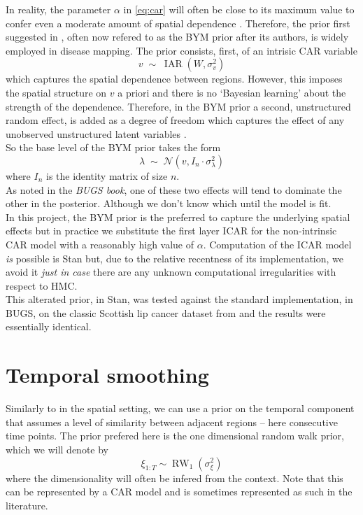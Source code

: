 \documentclass[11pt]{report}
\begin{document}
In reality, the parameter $\alpha$ in \ref{eq:car} will often be close to its maximum value to confer even a moderate amount of spatial dependence \citep{bugs}. Therefore, the prior first suggested in \citet*{bym}, often now refered to as the BYM prior after its authors, is widely employed in disease mapping. The prior consists, first, of an intrisic CAR variable
\begin{equation*}
v \; \sim \; \operatorname{IAR}(W, \sigma_v^2)
\end{equation*}
which captures the spatial dependence between regions. However, this imposes the spatial structure on $v$ a priori and there is no `Bayesian learning' about the strength of the dependence. Therefore, in the BYM prior a second, unstructured random effect, is added as a degree of freedom which captures the effect of any unobserved unstructured latent variables \citep{bugs}. \\

So the base level of the BYM prior takes the form
\begin{equation}
\lambda \; \sim \; \mathcal{N}(v, I_n \cdot \sigma_{\lambda}^2)
\end{equation}
where $I_n$ is the identity matrix of size $n$. \\

As noted in the \emph{BUGS book}, one of these two effects will tend to dominate the other in the posterior. Although we don't know which until the model is fit. \\

In this project, the BYM prior is the preferred to capture the underlying spatial effects but in practice we substitute the first layer ICAR for the non-intrinsic CAR model with a reasonably high value of $\alpha$. Computation of the ICAR model \emph{is} possible is Stan \citep{car} but, due to the relative recentness of its implementation, we avoid it \emph{just in case} there are any unknown computational irregularities with respect to HMC. \\

This alterated prior, in Stan, was tested against the standard implementation, in BUGS, on the classic Scottish lip cancer dataset from \citet{lipcancer} and the results were essentially identical.   

\section{Temporal smoothing}

Similarly to in the spatial setting, we can use a prior on the temporal component that assumes a level of similarity between adjacent regions -- here consecutive time points. The prior prefered here is the one dimensional random walk prior, which we will denote by
\begin{equation}
\xi_{1:T} \sim \operatorname{RW}_1(\sigma_\xi^2)
\end{equation}
where the dimensionality will often be infered from the context. Note that this can be represented by a CAR model and is sometimes represented as such in the literature. \\
\end{document}
